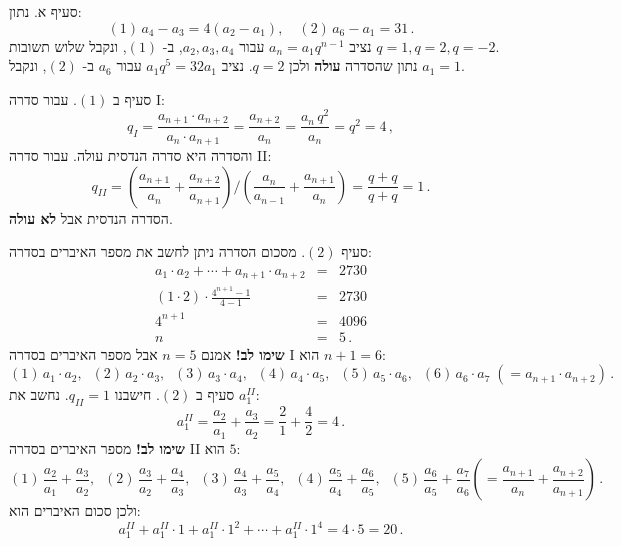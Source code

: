 \documentclass[12pt,a4paper]{article}
\begin{document}
סעיף א. נתון:
\[
(1)\, a_4-a_3 = 4 (a_2-a_1),\quad (2)\, a_6 - a_1 = 31\,.
\]
נציב
$a_n=a_1q^{n-1}$ 
עבור
$a_2, a_3, a_4$,
ב-%
$(1)$,
ונקבל שלוש תשובות
$q=1,q=2,q=-2$.\\
נתון שהסדרה 
\textbf{עולה}
ולכן
$q=2$.
נציב 
$a_1q^5=32 a_1$
עבור
$a_6$
ב-%
$(2)$,
ונקבל
$a_1=1$.

סעיף ב 
$(1)$.
עבור סדרה I:
\[
q_I=\frac{a_{n+1}\cdot a_{n+2}}{a_n\cdot a_{n+1}}=\frac{a_{n+2}}{a_n}=\frac{a_n\,q^2}{a_n}=q^2=4\,,
\]
והסדרה היא סדרה הנדסית עולה. עבור סדרה II:
\[
q_{II}=\left(\frac{a_{n+1}}{a_n} + \frac{a_{n+2}}{a_{n+1}}\right) / \left(\frac{a_{n}}{a_{n-1}} + \frac{a_{n+1}}{a_{n}}\right)=\frac{q+q}{q+q}=1\,.
\]
הסדרה הנדסית אבל
\textbf{לא עולה}.

סעיף
$(2)$.
מסכום הסדרה ניתן לחשב את מספר האיברים בסדרה:
\begin{eqnarray*}
a_1\cdot a_2 + \cdots + a_{n+1} \cdot a_{n+2} &=& 2730\\
(1\cdot 2)\cdot \frac{4^{n+1}-1}{4-1}&=&2730\\
4^{n+1}&=&4096\\
n&=&5\,.
\end{eqnarray*}
\textbf{שימו לב!}
אמנם
$n=5$
אבל מספר האיברים בסדרה I הוא 
$n+1=6$:
\[
(1)\, a_1\cdot a_2,\;\; (2)\,a_2\cdot a_3,\;\;(3)\, a_3\cdot a_4,\;\; (4)\,a_4\cdot a_5,\;\; (5)\,a_5\cdot a_6,\;\; (6)\,a_6\cdot a_7 \;(= a_{n+1}\cdot a_{n+2})\,.
\]
סעיף ב
$(2)$.
חישבנו
$q_{II}=1$.
נחשב את
$a_1^{II}$:
\[
a_1^{II}=\frac{a_{2}}{a_1} + \frac{a_{3}}{a_{2}}=\frac{2}{1}+\frac{4}{2}=4\,.
\]
\textbf{שימו לב!}
מספר האיברים בסדרה II הוא 
$5$:
\[
(1)\,\frac{a_2}{a_1}+\frac{a_3}{a_2},\;\;
(2)\,\frac{a_3}{a_2}+\frac{a_4}{a_3},\;\;
(3)\,\frac{a_4}{a_3}+\frac{a_5}{a_4},\;\;
(4)\,\frac{a_5}{a_4}+\frac{a_6}{a_5},\;\;
(5)\,\frac{a_6}{a_5}+\frac{a_7}{a_6} \left(= \frac{a_{n+1}}{a_n}+\frac{a_{n+2}}{a_{n+1}}\right)\,.
\]
ולכן סכום האיברים הוא:
\[
a_1^{II}+a_1^{II}\cdot 1 + a_1^{II}\cdot 1^2 + \cdots + a_1^{II}\cdot 1^4 = 4\cdot 5=20\,.
\]
\vspace*{-6ex}
\bigskip

\textbf{}
\end{document}
